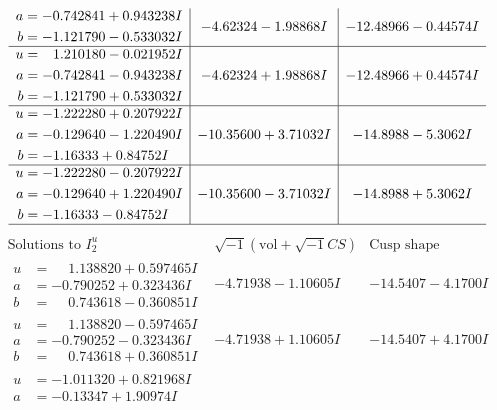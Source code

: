 \documentclass[1p]{elsarticle_modified}
\theoremstyle{definition}
\newcommand{\I}{\sqrt{-1}}
\begin{document}
$$\begin{array}{c|c|c}
\begin{aligned}
a &= -0.742841 + 0.943238 I \\
b &= -1.121790 - 0.533032 I\end{aligned}
 & -4.62324 - 1.98868 I & -12.48966 - 0.44574 I \\ \hline\begin{aligned}
u &= \phantom{-}1.210180 - 0.021952 I \\
a &= -0.742841 - 0.943238 I \\
b &= -1.121790 + 0.533032 I\end{aligned}
 & -4.62324 + 1.98868 I & -12.48966 + 0.44574 I \\ \hline\begin{aligned}
u &= -1.222280 + 0.207922 I \\
a &= -0.129640 - 1.220490 I \\
b &= -1.16333 + 0.84752 I\end{aligned}
 & -10.35600 + 3.71032 I & -14.8988 - 5.3062 I \\ \hline\begin{aligned}
u &= -1.222280 - 0.207922 I \\
a &= -0.129640 + 1.220490 I \\
b &= -1.16333 - 0.84752 I\end{aligned}
 & -10.35600 - 3.71032 I & -14.8988 + 5.3062 I\\
 \hline 
 \end{array}$$\newpage$$\begin{array}{c|c|c}  
\text{Solutions to }I^u_{2}& \I (\text{vol} + \sqrt{-1}CS) & \text{Cusp shape}\\
 \hline 
\begin{aligned}
u &= \phantom{-}1.138820 + 0.597465 I \\
a &= -0.790252 + 0.323436 I \\
b &= \phantom{-}0.743618 - 0.360851 I\end{aligned}
 & -4.71938 - 1.10605 I & -14.5407 - 4.1700 I \\ \hline\begin{aligned}
u &= \phantom{-}1.138820 - 0.597465 I \\
a &= -0.790252 - 0.323436 I \\
b &= \phantom{-}0.743618 + 0.360851 I\end{aligned}
 & -4.71938 + 1.10605 I & -14.5407 + 4.1700 I \\ \hline\begin{aligned}
u &= -1.011320 + 0.821968 I \\
a &= -0.13347 + 1.90974 I \\

\end{aligned}
\end{array}$$
\end{document}
